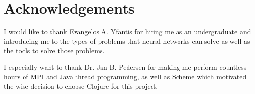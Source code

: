 \section*{Acknowledgements}
I would like to thank Evangelos A. Yfantis for hiring me as an undergraduate and introducing me to the types of problems that neural networks can solve as well as the tools to solve those problems. 

I especially want to thank Dr. Jan B. Pedersen for making me perform countless hours of MPI and Java thread programming, as well as Scheme which motivated the wise decision to choose Clojure for this project.